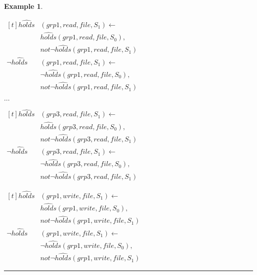 \documentclass[11pt, twocolumn]{article}
\newtheorem{vexmpl}{Example}
\newenvironment{vexample}
  {\begin{vexmpl}\rm}
  {\rule{2mm}{2mm}\end{vexmpl}}
\begin{document}
\begin{vexample}
\begin{enumerate}
              \begin{math}
                \begin{aligned}[t]
                  \hat{holds}&(grp1, read, file, S_{1}) \leftarrow \\
                  & \hat{holds}(grp1, read, file, S_{0}), \\
                  & not \lnot \hat{holds}(grp1, read, file, S_{1}) \\
                  \lnot \hat{holds}&(grp1, read, file, S_{1}) \leftarrow \\
                  & \lnot \hat{holds}(grp1, read, file, S_{0}), \\
                  & not \lnot \hat{holds}(grp1, read, file, S_{1})
                \end{aligned}
              \end{math}

              $\ldots$

              \begin{math}
                \begin{aligned}[t]
                  \hat{holds}&(grp3, read, file, S_{1}) \leftarrow \\
                  & \hat{holds}(grp3, read, file, S_{0}), \\
                  & not \lnot \hat{holds}(grp3, read, file, S_{1}) \\
                  \lnot \hat{holds}&(grp3, read, file, S_{1}) \leftarrow \\
                  & \lnot \hat{holds}(grp3, read, file, S_{0}), \\
                  & not \lnot \hat{holds}(grp3, read, file, S_{1})
                \end{aligned}
              \end{math}

              \begin{math}
                \begin{aligned}[t]
                  \hat{holds}&(grp1, write, file, S_{1}) \leftarrow \\
                  & \hat{holds}(grp1, write, file, S_{0}), \\
                  & not \lnot \hat{holds}(grp1, write, file, S_{1}) \\
                  \lnot \hat{holds}&(grp1, write, file, S_{1}) \leftarrow \\
                  & \lnot \hat{holds}(grp1, write, file, S_{0}), \\
                  & not \lnot \hat{holds}(grp1, write, file, S_{1})
                \end{aligned}
              \end{math}


\end{enumerate}
\end{vexample}
\end{document}
